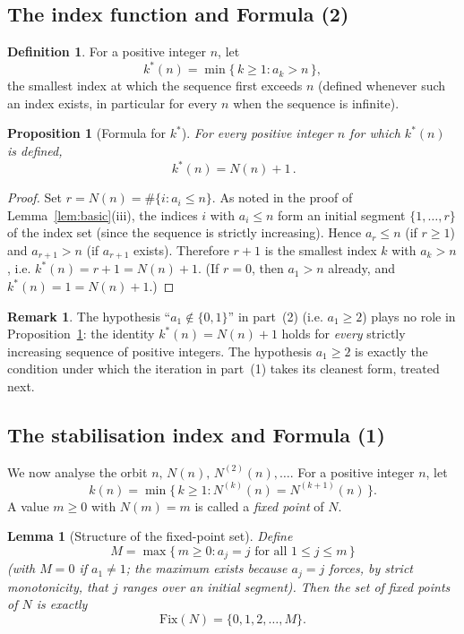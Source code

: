 \documentclass[12pt]{article}
\newtheorem{lemma}{Lemma}
\newtheorem{proposition}{Proposition}
\theoremstyle{definition}
\newtheorem{definition}{Definition}
\newtheorem{remark}{Remark}
\begin{document}
\subsection*{The index function and Formula (2)}

\begin{definition}\label{def:kstar}
For a positive integer $n$, let
\[
  k^*(n)=\min\{\,k\ge 1: a_k>n\,\},
\]
the smallest index at which the sequence first exceeds $n$ (defined whenever such an
index exists, in particular for every $n$ when the sequence is infinite).
\end{definition}

\begin{proposition}[Formula for $k^*$]\label{prop:kstar}
For every positive integer $n$ for which $k^*(n)$ is defined,
\[
  \boxed{\,k^*(n)=N(n)+1\,.}
\]
\end{proposition}

\begin{proof}
Set $r=N(n)=\#\{i:a_i\le n\}$. As noted in the proof of
Lemma~\ref{lem:basic}(iii), the indices $i$ with $a_i\le n$ form an initial segment
$\{1,\dots,r\}$ of the index set (since the sequence is strictly increasing). Hence
$a_r\le n$ (if $r\ge 1$) and $a_{r+1}>n$ (if $a_{r+1}$ exists). Therefore $r+1$ is
the smallest index $k$ with $a_k>n$, i.e. $k^*(n)=r+1=N(n)+1$. (If $r=0$, then
$a_1>n$ already, and $k^*(n)=1=N(n)+1$.)
\end{proof}

\begin{remark}
The hypothesis ``$a_1\notin\{0,1\}$'' in part~(2) (i.e. $a_1\ge 2$) plays no role in
Proposition~\ref{prop:kstar}: the identity $k^*(n)=N(n)+1$ holds for \emph{every}
strictly increasing sequence of positive integers. The hypothesis $a_1\ge 2$ is
exactly the condition under which the iteration in part~(1) takes its cleanest form,
treated next.
\end{remark}

\subsection*{The stabilisation index and Formula (1)}

We now analyse the orbit $n,\,N(n),\,N^{(2)}(n),\dots$. For a positive integer $n$,
let
\[
  k(n)=\min\{\,k\ge 1: N^{(k)}(n)=N^{(k+1)}(n)\,\}.
\]
A value $m\ge 0$ with $N(m)=m$ is called a \emph{fixed point} of $N$.

\begin{lemma}[Structure of the fixed-point set]\label{lem:fix}
Define
\[
  M=\max\{\,m\ge 0: a_j=j \text{ for all } 1\le j\le m\,\}
\]
(with $M=0$ if $a_1\ne 1$; the maximum exists because $a_j=j$ forces, by strict
monotonicity, that $j$ ranges over an initial segment). Then the set of fixed points
of $N$ is exactly
\[
  \mathrm{Fix}(N)=\{0,1,2,\dots,M\}.
\]
\end{lemma}
\end{document}
